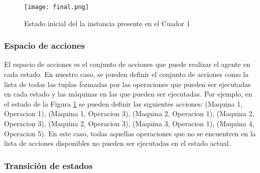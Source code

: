 \begin{figure}[ht]
    \centering
    \texttt{[image: final.png]}
    \caption{Estado inicial del la instancia presente en el Cuador 1}
    \label{fig:final-solution}
\end{figure}


\subsubsection{Espacio de acciones}
El espacio de acciones es el conjunto de acciones que puede realizar el agente en cada estado. 
En nuestro caso, se pueden definir el conjunto de acciones como la lista de todas las tuplas 
formadas por las operaciones que pueden ser ejecutadas en cada estado y las máquinas en las que
pueden ser ejecutadas. Por ejemplo, en el estado de la Figura \ref{fig:final-solution} se pueden
definir las siguientes acciones: (Maquina 1, Operacion 1), (Maquina 1, Operacion 3), 
(Maquina 2, Operacion 1), (Maquina 2, Operacion 3), (Maquina 2, Operacion 3), (Maquina 3, Operacion 1), 
(Maquina 4, Operacion 5). En este caso, todas aquellas operaciones que no se encuentren en la lista 
de acciones disponibles no pueden ser ejecutadas en el estado actual.

\subsubsection{Transición de estados}

\pagebreak
